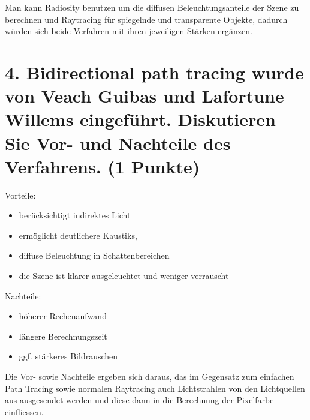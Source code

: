 \documentclass[12pt]{scrreprt}
\begin{document}
Man kann Radiosity benutzen um die diffusen Beleuchtungsanteile der Szene zu berechnen und Raytracing für spiegelnde und transparente Objekte, dadurch würden sich beide Verfahren mit ihren jeweiligen Stärken ergänzen.


\section*{4. Bidirectional path tracing wurde von Veach Guibas und Lafortune Willems eingeführt. Diskutieren Sie Vor- und Nachteile des Verfahrens. (1 Punkte)}

Vorteile:

\begin{itemize}
  \item berücksichtigt indirektes Licht
  \item ermöglicht deutlichere Kaustiks,
  \item diffuse Beleuchtung in Schattenbereichen
  \item die Szene ist klarer ausgeleuchtet und weniger verrauscht
\end{itemize}

Nachteile:

\begin{itemize}
  \item höherer Rechenaufwand
  \item längere Berechnungszeit
  \item ggf. stärkeres Bildrauschen
\end{itemize}

Die Vor- sowie Nachteile ergeben sich daraus, das im Gegensatz zum einfachen Path Tracing sowie normalen Raytracing auch Lichtstrahlen von den Lichtquellen aus ausgesendet werden und diese dann in die Berechnung der Pixelfarbe einfliessen.
\end{document}

